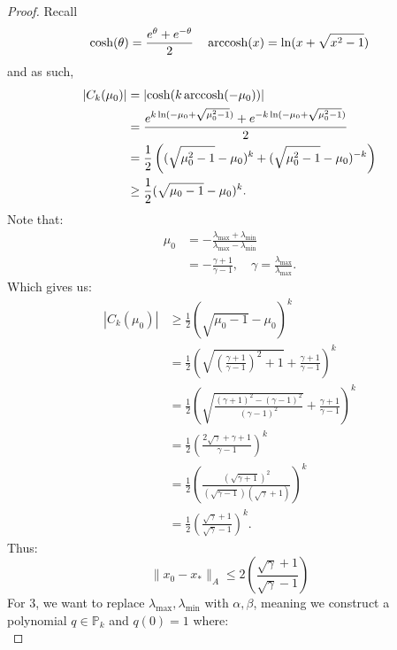 \documentclass[../main/main.tex]{subfiles}
\begin{document}
\begin{proof}
  Recall \[
\cosh(\theta) = \frac{e^{\theta}+e^{-\theta}}{2}  \quad \operatorname*{arccosh}(x) = \ln (x+\sqrt{x^2-1})
\] and as such,  \begin{align*}
                   |C_{k}(\mu_{0})| &= \left|\cosh (k \operatorname*{arccosh}(-\mu_{0}))\right| \\
                                    &= \frac{e^{k \ln (-\mu_{0}+\sqrt{\mu^2_{0}-1})}+e^{-k \ln (-\mu_{0}+\sqrt{\mu^2_{0}-1})}}{2}\\
                                    &= \frac{1}{2}\left( (\sqrt{\mu_{0}^2-1}-\mu_{0})^{k} +(\sqrt{\mu_{0}^2-1}-\mu_{0})^{-k} \right)\\
                   &\geq \frac{1}{2} (\sqrt{\mu_{0}-1}-\mu_{0})^{k}
                   .\end{align*}
                 Note that: \begin{align*}
                              \mu_{0} &= -\frac{\lambda_{\max}+\lambda_{\min}}{\lambda_{\max}-\lambda_{\min}}\\
                                      &= - \frac{\gamma+1}{\gamma-1} , \quad \gamma  = \frac{\lambda_{\max}}{\lambda_{\max}}
                              .\end{align*}
                            Which gives us:
                            \begin{align*}
                              |C_{k}(\mu_{0})| &\geq \frac{1}{2} (\sqrt{\mu_{0}-1}-\mu_{0})^{k}\\
                              &=\frac{1}{2}\left(\sqrt{\left(\frac{\gamma+1}{\gamma-1} \right)^2+1}+\frac{\gamma+1}{\gamma-1} \right)^{k}\\
                              &=\frac{1}{2}\left(\sqrt{ \frac{(\gamma+1)^2-(\gamma-1)^2}{(\gamma-1)^2}  } + \frac{\gamma+1}{\gamma-1} \right)^{k}\\
                              &=\frac{1}{2}\left(\frac{2\sqrt{\gamma}+\gamma+1}{\gamma-1} \right)^{k}\\
                              &=\frac{1}{2}\left( \frac{(\sqrt{\gamma+1})^2}{(\sqrt{\gamma-1})(\sqrt{\gamma}+1)}  \right)^{k}\\
                              &=\frac{1}{2}\left( \frac{\sqrt{\gamma}+1}{\sqrt{\gamma}-1}  \right)^{k}
                              .\end{align*}
                            Thus: \[
                              \|x_{0}-x_{*}\|_{A} \leq 2 \left(\frac{\sqrt{\gamma}+1}{\sqrt{\gamma}-1} \right)
                            \]
                            For 3, we want to replace $\lambda_{\max}, \lambda_{\min}$ with $\alpha, \beta$, meaning  we construct a polynomial $q\in\mathbb P_{k}$ and $q(0) = 1$ where: \[
\]
\end{proof}
\end{document}
